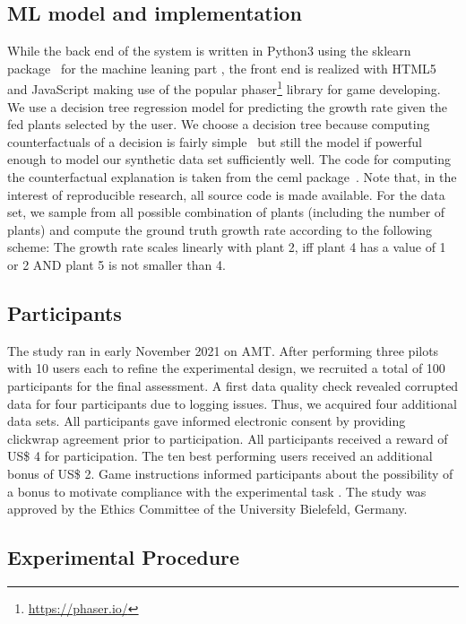 \subsection{ML model and implementation}
While the back end of the system is written in Python3 using the sklearn package~\citep{pedregosa_scikit-learn_2011} for the machine leaning part , the front end is realized with HTML5 and JavaScript making use of the popular phaser\footnote{\url{https://phaser.io/}} library for game developing.
We use a decision tree regression model for predicting the growth rate given the fed plants selected by the user. We choose a decision tree because computing counterfactuals of a decision is fairly simple~\citep{artelt_counterfactuals_survey_2019} but still the model if powerful enough to model our synthetic data set sufficiently well.
The code for computing the counterfactual explanation is taken from the ceml package~\citep{artelt_ceml_2019}.
Note that, in the interest of reproducible research, all source code is made available.
For the data set, we sample from all possible combination of plants (including the number of plants) and compute the ground truth growth rate according to the following scheme:
The growth rate scales linearly with plant 2, iff plant 4 has a value of 1 or 2 AND plant 5 is not smaller than 4.


\subsection{Participants}

The study ran in early November 2021 on \gls{AMT}.
After performing three pilots with 10 users each to refine the experimental design, we recruited a total of 100 participants for the final assessment. %
A first data quality check revealed corrupted data for four participants due to logging issues. Thus, we acquired four additional data sets. 
All participants gave informed electronic consent by providing clickwrap agreement prior to participation.
All participants received a reward of US\$ 4 for participation. 
The ten best performing users received an additional bonus of US\$ 2. 
Game instructions informed participants about the possibility of a bonus to motivate compliance with the experimental task \citep{bansal_updates_2019}.
The study was approved by the Ethics Committee of the University Bielefeld, Germany.

\subsection{Experimental Procedure}\label{subsec:experimental-procedure}

